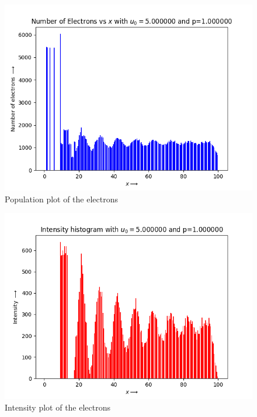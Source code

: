 \documentclass[11pt, a4paper]{article}
\begin{document}
\begin{figure}[!tbh]
\centering
\includegraphics[scale=0.56]{hist2_elec_density.png} 
\caption{Population plot of the electrons}
\label{fig:1fig_1}
\end{figure} 

\begin{figure}[!tbh]
\centering
\includegraphics[scale=0.56]{hist2_intensity.png} 
\caption{Intensity plot of the electrons}
\label{fig:1fig_2}
\end{figure} 
\end{document}
